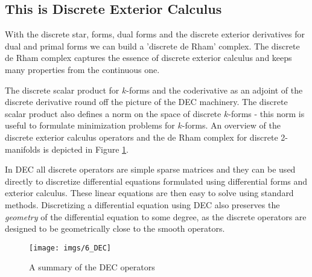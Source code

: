  
\subsection{This is Discrete Exterior Calculus}


With the discrete star, forms, dual forms and the discrete exterior derivatives for dual and primal forms we can build a 'discrete de Rham' complex. The discrete de Rham complex captures the essence of discrete exterior calculus and keeps many properties from the continuous one. 

The discrete scalar product for $k$-forms and the coderivative as an adjoint of the discrete derivative round off the picture of the DEC machinery. The discrete scalar product also defines a norm on the space of discrete $k$-forms - this norm is useful to formulate minimization problems for $k$-forms.
An overview of the discrete exterior calculus operators and the de Rham complex for discrete 2-manifolds is depicted in Figure \ref{fig:DEC}. 

In DEC all discrete operators are simple sparse matrices and they can be used directly to discretize differential equations formulated using differential forms and exterior calculus. These linear equations are then easy to solve using standard methods. Discretizing a differential equation using DEC also preserves the \emph{geometry} of the differential equation to some degree, as the discrete operators are designed to be geometrically close to the smooth operators.


\begin{figure}%
\begin{center}
\texttt{[image: imgs/6\_DEC]}%
\end{center}
\caption{A summary of the DEC operators}%
\label{fig:DEC}%
\end{figure}
